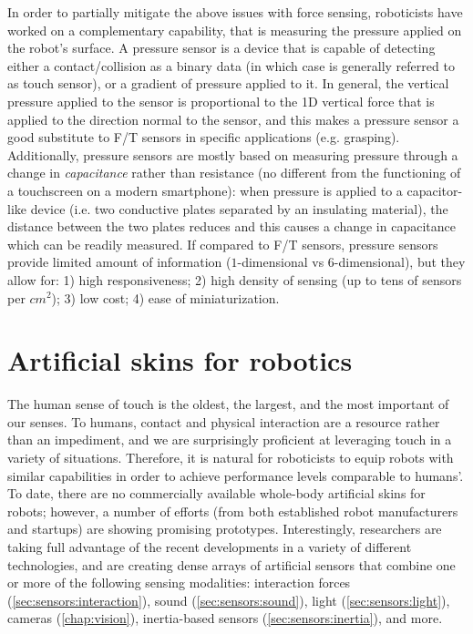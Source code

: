 In order to partially mitigate the above issues with force sensing, roboticists have worked on a complementary capability, that is measuring the pressure applied on the robot's surface.
A pressure sensor is a device that is capable of detecting either a contact/collision as a binary data (in which case is generally referred to as touch sensor), or a gradient of pressure applied to it.
In general, the vertical pressure applied to the sensor is proportional to the 1D vertical force that is applied to the direction normal to the sensor, and this makes a pressure sensor a good substitute to F/T sensors in specific applications (e.g. grasping).
Additionally, pressure sensors are mostly based on measuring pressure through a change in \textsl{capacitance} rather than resistance (no different from the functioning of a touchscreen on a modern smartphone): when pressure is applied to a capacitor-like device (i.e. two conductive plates separated by an insulating material), the distance between the two plates reduces and this causes a change in capacitance which can be readily measured.
If compared to F/T sensors, pressure sensors provide limited amount of information ($1$-dimensional vs $6$-dimensional), but they allow for: 1) high responsiveness; 2) high density of sensing (up to tens of sensors per $cm^2$); 3) low cost; 4) ease of miniaturization.

\section{Artificial skins for robotics}

The human sense of touch is the oldest, the largest, and the most important of our senses.
To humans, contact and physical interaction are a resource rather than an impediment, and we are surprisingly proficient at leveraging touch in a variety of situations.
Therefore, it is natural for roboticists to equip robots with similar capabilities in order to achieve performance levels comparable to humans'.
To date, there are no commercially available whole-body artificial skins for robots; however, a number of efforts (from both established robot manufacturers and startups) are showing promising prototypes.
Interestingly, researchers are taking full advantage of the recent developments in a variety of different technologies, and are creating dense arrays of artificial sensors that combine one or more of the following sensing modalities: interaction forces (\cref{sec:sensors:interaction}), sound (\cref{sec:sensors:sound}), light (\cref{sec:sensors:light}), cameras (\cref{chap:vision}), inertia-based sensors (\cref{sec:sensors:inertia}), and more.

